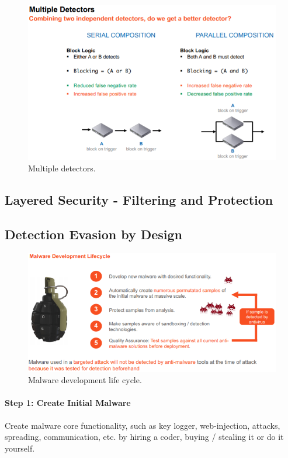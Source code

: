 \begin{figure}[h]
	\centering
	\includegraphics[scale=0.6]{images/911-combine.PNG}
	\caption{Multiple detectors.}
	\label{fig:detect}
\end{figure}



\subsection{Layered Security - Filtering and Protection}



\subsection{Detection Evasion by Design}

\begin{figure}[h]
	\centering
	\includegraphics[scale=0.6]{images/911-malware.PNG}
	\caption{Malware development life cycle.}
	\label{fig:malware}
\end{figure}

\paragraph{Step 1: Create Initial Malware}
Create malware core functionality, such as key logger, web-injection, attacks, spreading, communication, etc. by hiring a coder, buying / stealing it or do it yourself.

